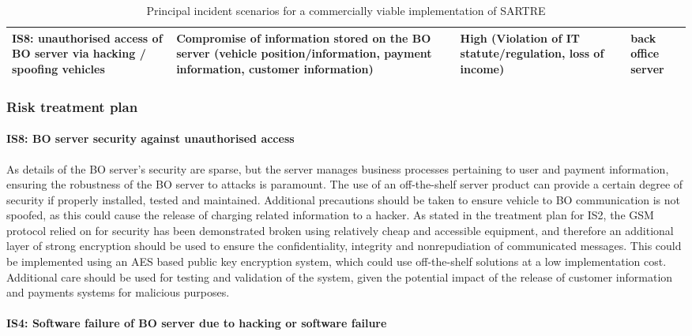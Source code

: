 \documentclass[british,11pt,a4paper]{article}
\begin{document}
\begin{table}[]
\begin{tabular}{|p{4cm}|p{4cm}|p{3cm}|p{3cm}|}
\textbf{IS8:} unauthorised access of BO server via hacking / spoofing vehicles & Compromise of information stored on the BO server (vehicle position/information, payment information, customer information) & High (Violation of IT statute/regulation, loss of income) & back office server \\ \hline
\end{tabular}%
\caption{Principal incident scenarios for a commercially viable implementation of SARTRE}
\label{tab:incident_scenarios}
\end{table}

\clearpage
\subsubsection{Risk treatment plan}

\paragraph{IS8: BO server security against unauthorised access \newline} 

As details of the BO server’s security are sparse, but the server manages business processes pertaining to user and payment information, ensuring the robustness of the BO server to attacks is paramount. The use of an off-the-shelf server product can provide a certain degree of security if properly installed, tested and maintained. Additional precautions should be taken to ensure vehicle to BO communication is not spoofed, as this could cause the release of charging related information to a hacker. As stated in the treatment plan for IS2, the GSM protocol relied on for security has been demonstrated broken using relatively cheap and accessible equipment, and therefore an additional layer of strong encryption should be used to ensure the confidentiality, integrity and nonrepudiation of communicated messages. This could be implemented using an AES based public key encryption system, which could use off-the-shelf solutions at a low implementation cost. Additional care should be used for testing and validation of the system, given the potential impact of the release of customer information and payments systems for malicious purposes. 

\paragraph{IS4: Software failure of BO server due to hacking or software failure \newline} 
\end{document}

